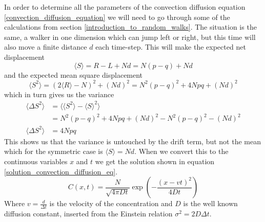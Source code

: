 In order to determine all the parameters of the convection diffusion equation \eqref{convection_diffusion_equation} we will need to go through some of the calculations from section \ref{introduction_to_random_walks}. 
The situation is the same, a walker in one dimension which can jump left or right, but this time will also move a finite distance $d$ each time-step. 
This will make the expected net displacement
\begin{equation*}
 \langle S\rangle = R-L +Nd = N(p-q) + Nd
\end{equation*}
and the expected mean square displacement
\begin{equation*}
 \langle S^2\rangle = (2\langle R\rangle -N)^2 +(Nd)^2 = N^2(p-q)^2 +4Npq +(Nd)^2
\end{equation*}
which in turn gives us the variance
\begin{align*}
 \langle \Delta S^2\rangle &= \langle\langle S^2\rangle-\langle S\rangle^2\rangle \\
 &= N^2(p-q)^2 +4Npq +(Nd)^2 - N^2(p-q)^2 -(Nd)^2 \\
\langle \Delta S^2\rangle &= 4Npq
\end{align*}
This shows us that the variance is untouched by the drift term, but not the mean which for the symmetric case is $\langle S\rangle = Nd$. 
When we convert this to the continuous variables $x$ and $t$ we get the solution shown in equation \ref{solution_convection_diffusion_eq}.
\begin{equation}\label{solution_convection_diffusion_eq}
 C(x,t) = \frac{N}{\sqrt{4\pi Dt}}\exp\left(-\frac{(x-vt)^2}{4Dt}\right)
\end{equation}
Where $v = \frac{d}{\Delta t}$ is the velocity of the concentration and $D$ is the well known diffusion constant, inserted from the Einstein relation $\sigma^2 = 2D\Delta t$.\\


